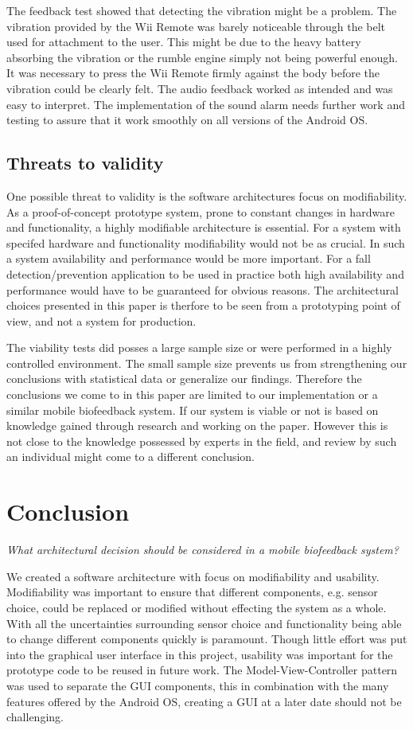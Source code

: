 The feedback test showed that detecting the vibration might be a problem. The vibration provided by the Wii Remote was barely noticeable through the belt used for attachment to the user. This might be due to the heavy battery absorbing the vibration or the rumble engine simply not being powerful enough. It was necessary to press the Wii Remote firmly against the body before the vibration could be clearly felt. The audio feedback worked as intended and was easy to interpret. The implementation of the sound alarm needs further work and testing to assure that it work smoothly on all versions of the Android OS.

\subsection{Threats to validity}
One possible threat to validity is the software architectures focus on modifiability. As a proof-of-concept prototype system, prone to constant changes in hardware and functionality, a highly modifiable architecture is essential. For a system with specifed hardware and functionality modifiability would not be as crucial. In such a system availability and performance would be more important. For a fall detection/prevention application to be used in practice both high availability and performance would have to be guaranteed for obvious reasons. The architectural choices presented in this paper is therfore to be seen from a prototyping point of view, and not a system for production.

The viability tests did posses a large sample size or were performed in a highly controlled environment. The small sample size prevents us from strengthening our conclusions with statistical data or generalize our findings. Therefore the conclusions we come to in this paper are limited to our implementation or a similar mobile biofeedback system. If our system is viable or not is based on knowledge gained through research and working on the paper. However this is not close to the knowledge possessed by experts in the field, and review by such an individual might come to a different conclusion.


\section{Conclusion}

\textit{What architectural decision should be considered in a mobile biofeedback system?}


We created a software architecture with focus on modifiability and usability. Modifiability was important to ensure that different components, e.g. sensor choice, could be replaced or modified without effecting the system as a whole. With all the uncertainties surrounding sensor choice and functionality being able to change different components quickly is paramount. Though little effort was put into the graphical user interface in this project, usability was important for the prototype code to be reused in future work. The Model-View-Controller pattern was used to separate the GUI components, this in combination with the many features offered by the Android OS, creating a GUI at a later date should not be challenging.

